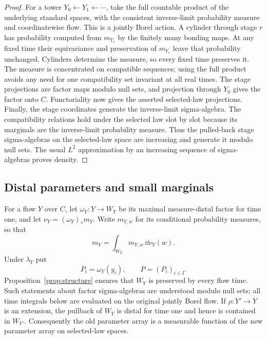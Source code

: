 \begin{proof}
For a tower $Y_0\leftarrow Y_1\leftarrow\cdots$, take the full
countable product of the underlying standard spaces, with the
consistent inverse-limit probability measure and coordinatewise
flow.  This is a jointly Borel action.  A cylinder through stage $r$
has probability computed from $m_{Y_r}$ by the finitely many bonding
maps.  At any fixed time their equivariance and preservation of
$m_{Y_r}$ leave that probability unchanged.  Cylinders determine the
measure, so every fixed time preserves it.  The measure is
concentrated on compatible sequences; using
the full product avoids any need for one compatibility set invariant
at all real times.  The stage projections are factor maps modulo
null sets, and projection through $Y_0$ gives the factor onto $C$.
Functoriality now gives the asserted selected-law projections.
Finally, the stage coordinates generate the inverse-limit
sigma-algebra.  The compatibility relations hold under the selected
law slot by slot because its marginals are the inverse-limit
probability measure.  Thus the pulled-back stage sigma-algebras on
the selected-law space are increasing and generate it modulo null
sets.  The usual $L^2$ approximation by an increasing sequence of
sigma-algebras proves density.
\end{proof}

\subsection{Distal parameters and small marginals}

For a flow $Y$ over $C$, let
$\omega_Y:Y\to W_Y$ be its maximal measure-distal factor for time one,
and let $\nu_Y=(\omega_Y)_*m_Y$.  Write $m_{Y,w}$ for its conditional
probability measures, so that
\[
 m_Y=\int_{W_Y}m_{Y,w}\,\dd\nu_Y(w).
\]
Under $\lambda_Y$ put
\begin{equation}\label{eq:distal-parameters}
 P_i=\omega_Y(y_i),\qquad P=(P_i)_{i\in I}.
\end{equation}
Proposition~\ref{prop:structure} ensures that $W_Y$ is preserved by
every flow time.  Such statements about factor sigma-algebras are
understood modulo null sets; all time integrals below are evaluated
on the original jointly Borel flow.  If $\rho:Y'\to Y$ is an extension,
the pullback of $W_Y$ is distal for time one and hence is contained
in $W_{Y'}$.  Consequently the old parameter array is a measurable
function of the new parameter array on selected-law spaces.

